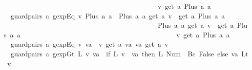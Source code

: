 \begin{isabellebody}
\ \ \ \ \ \ \ \ \ \ \ \ \ \ \ \ \ \ \ \ \ \ \ \ \ \ \ \ \ \ \ \ \ \ \ \ \ \ \ \ \ \ \ \ \ {\isacharparenleft}v{\isacharcomma}\ get\ a\ {\isacharparenleft}Plus\ a{}\ a{}{\isacharparenright}{\isacharparenright}{\isacharbrackright}{\isachardoublequoteclose}\ {\isacharbar}\isanewline
\ \ {\isachardoublequoteopen}guard{}pairs\ a\ {\isacharparenleft}gexp{\isachardot}Eq\ v\ {\isacharparenleft}Plus\ a{}\ a{}{\isacharparenright}{\isacharparenright}\ {\isacharequal}\ {\isacharbrackleft}{\isacharparenleft}{\isacharparenleft}Plus\ a{}\ a{}{\isacharparenright}{\isacharcomma}\ {\isacharparenleft}get\ a\ v{\isacharparenright}\ {\isacharbar}{\isasymunion}{\isacharbar}\ {\isacharparenleft}get\ a\ {\isacharparenleft}Plus\ a{}\ a{}{\isacharparenright}{\isacharparenright}{\isacharparenright}{\isacharcomma}\isanewline
\ \ \ \ \ \ \ \ \ \ \ \ \ \ \ \ \ \ \ \ \ \ \ \ \ \ \ \ \ \ \ \ \ \ \ \ \ \ \ \ \ \ \ \ \ {\isacharparenleft}{\isacharparenleft}Plus\ a{}\ a{}{\isacharparenright}{\isacharcomma}\ {\isacharparenleft}get\ a\ v{\isacharparenright}\ {\isacharbar}{\isasymunion}{\isacharbar}\ {\isacharparenleft}get\ a\ {\isacharparenleft}Plus\ a{}\ a{}{\isacharparenright}{\isacharparenright}{\isacharparenright}{\isacharcomma}\isanewline
\ \ \ \ \ \ \ \ \ \ \ \ \ \ \ \ \ \ \ \ \ \ \ \ \ \ \ \ \ \ \ \ \ \ \ \ \ \ \ \ \ \ \ \ \ {\isacharparenleft}v{\isacharcomma}\ get\ a\ {\isacharparenleft}Plus\ a{}\ a{}{\isacharparenright}{\isacharparenright}{\isacharbrackright}{\isachardoublequoteclose}\ {\isacharbar}\isanewline
\ \ {\isachardoublequoteopen}guard{}pairs\ a\ {\isacharparenleft}gexp{\isachardot}Eq\ v\ va{\isacharparenright}\ {\isacharequal}\ {\isacharbrackleft}{\isacharparenleft}v{\isacharcomma}\ get\ a\ va{\isacharparenright}{\isacharcomma}\ {\isacharparenleft}va{\isacharcomma}\ get\ a\ v{\isacharparenright}{\isacharbrackright}{\isachardoublequoteclose}\ {\isacharbar}\isanewline
\isanewline
\ \ {\isachardoublequoteopen}guard{}pairs\ a\ {\isacharparenleft}gexp{\isachardot}Gt\ {\isacharparenleft}L\ v{\isacharparenright}\ va{\isacharparenright}\ {\isacharequal}\ {\isacharparenleft}if\ L\ v\ {\isacharequal}\ va\ then\ {\isacharbrackleft}{\isacharparenleft}L\ {\isacharparenleft}Num\ {}{\isacharparenright}{\isacharcomma}\ {\isacharbraceleft}{\isacharbar}Bc\ False{\isacharbar}{\isacharbraceright}{\isacharparenright}{\isacharbrackright}\ else\ {\isacharbrackleft}{\isacharparenleft}va{\isacharcomma}\ {\isacharbraceleft}{\isacharbar}Lt\ v{\isacharbar}{\isacharbraceright}{\isacharparenright}{\isacharbrackright}{\isacharparenright}{\isachardoublequoteclose}\ {\isacharbar}\isanewline

\end{isabellebody}
